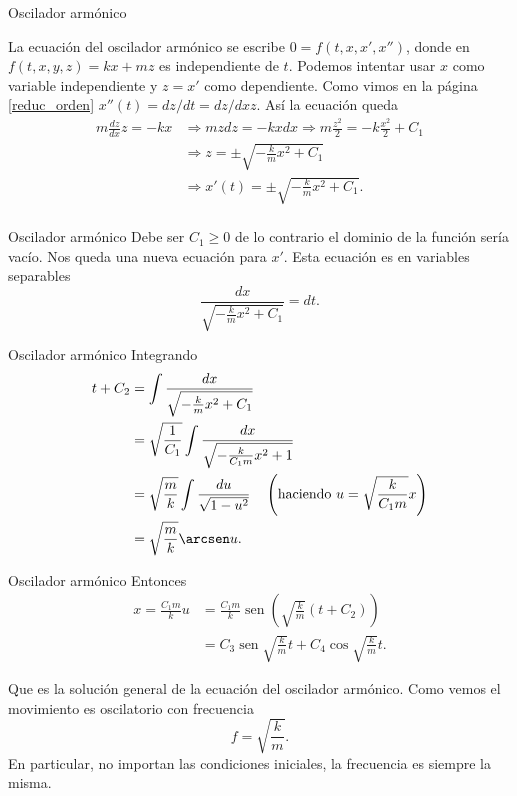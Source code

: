 \documentclass[handout,hyperref={colorlinks=true}]{beamer}
\DeclareMathOperator{\sen}{sen}
\begin{document}
\begin{frame}{Oscilador armónico}

La ecuación del oscilador armónico se escribe $0=f(t,x,x',x'')$, donde en $f(t,x,y,z)=kx+mz$ es independiente de $t$. Podemos intentar usar $x$ como variable 
independiente y $z=x'$ como dependiente. Como vimos en la página \ref{reduc_orden} $x''(t)=dz/dt=dz/dx z$. Así la ecuación queda
\[\begin{split}
   m\frac{dz}{dx}z=-kx &\Longrightarrow mzdz=-kxdx\Longrightarrow m\frac{z^2}{2}=-k\frac{x^2}{2}+C_1\\
   &\Longrightarrow z=\pm\sqrt{-\frac{k}{m}x^2+C_1}\\
   &\Longrightarrow x'(t)=\pm\sqrt{-\frac{k}{m}x^2+C_1}.\\
  \end{split}
\]


\end{frame}


\begin{frame}{Oscilador armónico}
Debe ser $C_1\geq 0$ de lo contrario el dominio de la función sería vacío. Nos queda una nueva ecuación para $x'$.
Esta ecuación es en variables separables
\[ \frac{dx}{\sqrt{-\frac{k}{m}x^2+C_1}}=dt.   
\]

\end{frame}

\begin{frame}{Oscilador armónico}
 Integrando
\[\begin{split}
   t+C_2 
   &=\int \frac{dx}{\sqrt{-\frac{k}{m}x^2+C_1}}\\
   &= \sqrt{\frac{1}{C_1}} \int \frac{dx}{\sqrt{-\frac{k}{C_1m}x^2+1}} \\  
   &= \sqrt{\frac{m}{k}} \int \frac{du}{\sqrt{1-u^2}}\quad \left(\text{haciendo } u=\sqrt{\frac{k}{C_1m}}x\right)\\ 
   &=\sqrt{\frac{m}{k}}\arcsen u.
  \end{split}
\]
\end{frame}

\begin{frame}{Oscilador armónico}
Entonces
\[\begin{split}
    x=\frac{C_1m}{k}u &=\frac{C_1m}{k}\sen \left(\sqrt{\frac{k}{m}}(t+C_2)\right)\\
    &=\boxed{C_3\sen \sqrt{\frac{k}{m}}t+C_4\cos \sqrt{\frac{k}{m}}t}.
  \end{split}
 \]

Que es la solución general de la ecuación del oscilador armónico. Como vemos el movimiento es oscilatorio con frecuencia
\[\boxed{f=\sqrt{\frac{k}{m}} }.\]
En particular, no importan las condiciones iniciales, la frecuencia es siempre la misma. 

 
 

\end{frame}
\end{document}

